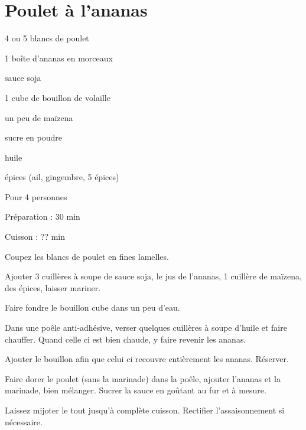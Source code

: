 \section[\normalsize{Poulet à l'ananas}]{Poulet à l'ananas}

\begin{ingredients}
\item 4 ou 5 blancs de poulet
\item 1 bo\^ite d'ananas en morceaux
\item sauce soja
\item 1 cube de bouillon de volaille
\item un peu de maïzena
\item sucre en poudre
\item huile
\item \'epices (ail, gingembre, 5 \'epices) 
\end{ingredients}
\begin{infos}
\item Pour 4 personnes
\item Préparation : 30 min
\item Cuisson : ?? min
\end{infos}
\begin{etapes}
\item Coupez les blancs de poulet en fines lamelles. 
\item Ajouter 3 cuill\`eres \`a soupe de sauce soja, le jus de l'ananas, 1 cuill\`ere de maïzena, des \'epices, laisser mariner.
\item Faire fondre le bouillon cube dans un peu d'eau.
\item Dans une po\^ele anti-adh\'esive, verser quelques cuill\`eres \`a soupe d'huile et faire chauffer. Quand celle ci est bien chaude, y faire revenir les ananas. 
\item Ajouter le bouillon afin que celui ci recouvre enti\`erement les ananas. R\'eserver.
\item Faire dorer le poulet (sans la marinade) dans la po\^ele, ajouter l'ananas et la marinade, bien m\'elanger. Sucrer la sauce en goûtant au fur et \`a mesure.
\item Laissez mijoter le tout jusqu'\`a compl\`ete cuisson. Rectifier l'assaisonnement si n\'ecessaire.
\end{etapes}
\begin{conseils}
\end{conseils}

